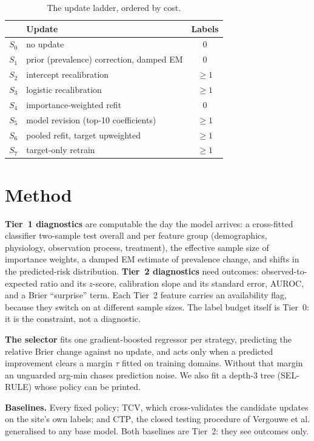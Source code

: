 \documentclass[10pt,twocolumn]{article}
\begin{document}
\begin{table}[t]\centering\small
\caption{The update ladder, ordered by cost.}
\label{tab:ladder}
\begin{tabular}{llc}
\toprule
& Update & Labels \\
\midrule
$S_0$ & no update & 0 \\
$S_1$ & prior (prevalence) correction, damped EM & 0 \\
$S_2$ & intercept recalibration & $\geq 1$ \\
$S_3$ & logistic recalibration & $\geq 1$ \\
$S_4$ & importance-weighted refit & 0 \\
$S_5$ & model revision (top-10 coefficients) & $\geq 1$ \\
$S_6$ & pooled refit, target upweighted & $\geq 1$ \\
$S_7$ & target-only retrain & $\geq 1$ \\
\bottomrule
\end{tabular}
\end{table}

\section{Method}
\textbf{Tier~1 diagnostics} are computable the day the model arrives: a
cross-fitted classifier two-sample test overall and per feature group
(demographics, physiology, observation process, treatment), the effective
sample size of importance weights, a damped EM estimate of prevalence change,
and shifts in the predicted-risk distribution. \textbf{Tier~2 diagnostics}
need outcomes: observed-to-expected ratio and its $z$-score, calibration slope
and its standard error, AUROC, and a Brier ``surprise'' term. Each Tier~2
feature carries an availability flag, because they switch on at different
sample sizes. The label budget itself is Tier~0: it is the constraint, not a
diagnostic.

\textbf{The selector} fits one gradient-boosted regressor per strategy,
predicting the relative Brier change against no update, and acts only when a
predicted improvement clears a margin $\tau$ fitted on training domains.
Without that margin an unguarded arg-min chases prediction noise. We also fit a
depth-3 tree (SEL-RULE) whose policy can be printed.

\textbf{Baselines.} Every fixed policy; \textsc{TCV}, which cross-validates
the candidate updates on the site's own labels; and \textsc{CTP}, the closed
testing procedure of Vergouwe et al. \cite{vergouwe2017} generalised to any
base model. Both baselines are Tier~2: they see outcomes only.
\end{document}
